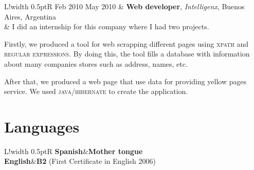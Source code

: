 \documentclass[10pt]{article}
\newcommand\VRule{\color{lightgray}\vrule width 0.5pt}
\begin{document}
\begin{tabular}{L!{\VRule}R}
Feb 2010 May 2010 & \textbf{Web developer}, \textit{Intelligenx}, Buenos 
Aires, Argentina\\
& \vspace{-0.7cm} I did an internship for this company where I had two 
projects.

Firstly, we produced a tool for web scrapping different pages using
\textsc{xpath} and \textsc{regular expressions}. By doing this, the tool fills 
a
database with information about many companies stores such as address, names, 
etc.

After that, we produced a web page that use data for providing yellow 
pages service. We used \textsc{java/hibernate} to create the application. \\
\end{tabular}



\section*{Languages}

\begin{tabular}{L!{\VRule}R}
{\bf Spanish}&{\bf Mother tongue}\\
{\bf English}&{\bf B2} (First Certificate in English 2006)\\
\end{tabular}
\end{document}
